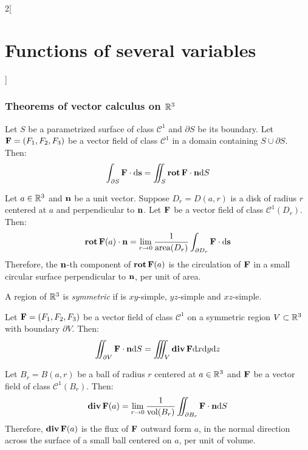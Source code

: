 \documentclass[../../../main.tex]{subfiles}
\begin{document}
\begin{multicols}{2}[\section{Functions of several variables}]
  \subsubsection{Theorems of vector calculus on \texorpdfstring{$\mathbb{R}^3$}{R3}}
  \begin{theorem}
    Let $S$ be a parametrized surface of class $\mathcal{C}^1$ and $\partial S$ be its boundary. Let $\boldsymbol{\mathrm{F}}=(F_1,F_2,F_3)$ be a vector field of class $\mathcal{C}^1$ in a domain containing $S\cup\partial S$. Then: $$\int_{\partial S}\boldsymbol{\mathrm{F}}\cdot \dd \boldsymbol{\mathrm{s}}=\iint_S\operatorname{\boldsymbol{\mathrm{rot}}}\boldsymbol{\mathrm{F}}\cdot\boldsymbol{\mathrm{n}} \dd S$$
  \end{theorem}
  \begin{corollary}
    Let $a\in\mathbb{R}^3$ and $\boldsymbol{\mathrm{n}}$ be a unit vector. Suppose $D_r=D(a,r)$ is a disk of radius $r$ centered at $a$ and perpendicular to $\boldsymbol{\mathrm{n}}$. Let $\boldsymbol{\mathrm{F}}$ be a vector field of class $\mathcal{C}^1(D_r)$. Then: $$\operatorname{\boldsymbol{\mathrm{rot}}}\boldsymbol{\mathrm{F}}(a)\cdot\boldsymbol{\mathrm{n}}=\lim_{r\to 0}\frac{1}{\text{area}(D_r)}\int_{\partial D_r}\boldsymbol{\mathrm{F}}\cdot \dd \boldsymbol{\mathrm{s}}$$ Therefore, the $\boldsymbol{\mathrm{n}}$-th component of $\operatorname{\boldsymbol{\mathrm{rot}}}\boldsymbol{\mathrm{F}}(a)$ is the circulation of $\boldsymbol{\mathrm{F}}$ in a small circular surface perpendicular to $\boldsymbol{\mathrm{n}}$, per unit of area.
  \end{corollary}
  \begin{definition}
    A region of $\mathbb{R}^3$ is \textit{symmetric} if is $xy$-simple, $yz$-simple and $xz$-simple.
  \end{definition}
  \begin{theorem}
    Let $\boldsymbol{\mathrm{F}}=(F_1,F_2,F_3)$ be a vector field of class $\mathcal{C}^1$ on a symmetric region $V\subset\mathbb{R}^3$ with boundary $\partial V$. Then: $$\iint_{\partial V}\boldsymbol{\mathrm{F}}\cdot\boldsymbol{\mathrm{n}} \dd S=\iiint_V\operatorname{\boldsymbol{\mathrm{div}}}\boldsymbol{\mathrm{F}}\dd x\dd y\dd z$$
  \end{theorem}
  \begin{corollary}
    Let $B_r=B(a,r)$ be a ball of radius $r$ centered at $a\in\mathbb{R}^3$ and $\boldsymbol{\mathrm{F}}$ be a vector field of class $\mathcal{C}^1(B_r)$. Then: $$\operatorname{\boldsymbol{\mathrm{div}}}\boldsymbol{\mathrm{F}}(a)=\lim_{r\to 0}\frac{1}{\text{vol}(B_r)}\iint_{\partial B_r}\boldsymbol{\mathrm{F}}\cdot\boldsymbol{\mathrm{n}} \dd S$$ Therefore, $\operatorname{\boldsymbol{\mathrm{div}}}\boldsymbol{\mathrm{F}}(a)$ is the flux of $\boldsymbol{\mathrm{F}}$ outward form $a$, in the normal direction across the surface of a small ball centered on $a$, per unit of volume.
  \end{corollary}
\end{multicols}
\end{document}

